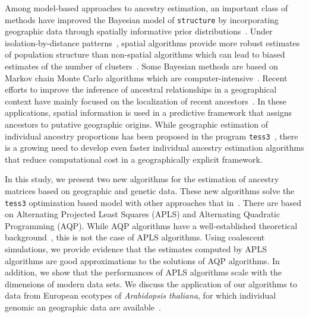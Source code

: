  Among model-based approaches to ancestry estimation, an important class of methods have improved the Bayesian model of {\tt structure} by incorporating geographic data through spatially informative prior distributions~\citep{Chen2007, Corander2008}. Under isolation-by-distance patterns~\citep{Wright1943, Malecot1948}, spatial algorithms provide more robust estimates of population structure than non-spatial algorithms which can lead to biased estimates of the number of clusters~\citep{Durand2009}.  Some Bayesian methods are based on Markov chain Monte Carlo algorithms which are computer-intensive~\citep{Francois2010}. Recent efforts to improve the inference of ancestral relationships in a geographical context have mainly focused on the localization of recent ancestors~\citep{Baran2013, Lao2014, Yang2014}. In these applications, spatial information is used in a predictive framework that assigns ancestors to putative geographic origins. While geographic estimation of individual ancestry proportions has been proposed in the program {\tt tess3}~\citep{Caye2016}, there is a growing need to develop even faster individual ancestry estimation algorithms that reduce computational cost in a geographically explicit framework. 

In this study, we present two new algorithms for the estimation of ancestry matrices based on geographic and genetic data. These new algorithms solve the {\tt tess3} optimization based model with other approaches that in~\cite{Caye2016}. There are based on Alternating Projected Least Squares (APLS) and Alternating Quadratic Programming  (AQP). While AQP algorithms have a well-established theoretical background~\citep{Bertsekas1995}, this is not the case of APLS algorithms. Using coalescent simulations, we provide evidence that the estimates computed by APLS algorithms are good approximations to the solutions of AQP algorithms. In addition, we show that the performances of APLS algorithms scale with the dimensions of modern data sets. We discuss the application of our algorithms to data from European ecotypes of {\it Arabidopsis thaliana}, for which individual genomic an geographic data are available~\citep{Horton2012}. 



